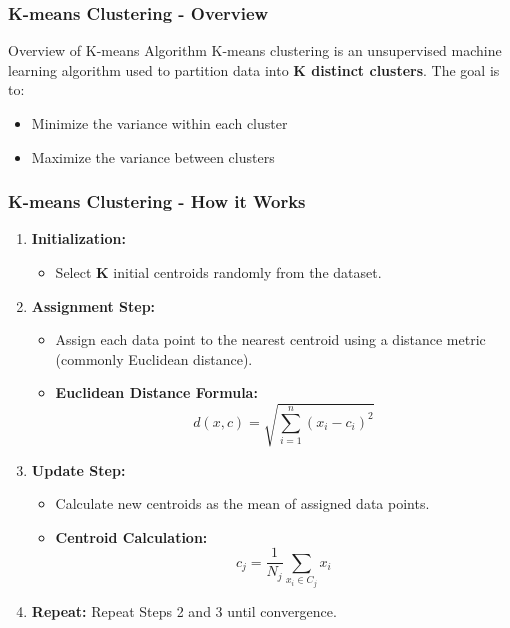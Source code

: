 \documentclass[aspectratio=169]{beamer}
\begin{document}
\begin{frame}[fragile]
    \frametitle{K-means Clustering - Overview}
    \begin{block}{Overview of K-means Algorithm}
        K-means clustering is an unsupervised machine learning algorithm used to partition data into \textbf{K distinct clusters}. The goal is to:
        \begin{itemize}
            \item Minimize the variance within each cluster
            \item Maximize the variance between clusters
        \end{itemize}
    \end{block}
\end{frame}

\begin{frame}[fragile]
    \frametitle{K-means Clustering - How it Works}
    \begin{enumerate}
        \item \textbf{Initialization:}
        \begin{itemize}
            \item Select \textbf{K} initial centroids randomly from the dataset.
        \end{itemize}
        \item \textbf{Assignment Step:}
        \begin{itemize}
            \item Assign each data point to the nearest centroid using a distance metric (commonly Euclidean distance).
            \item \textbf{Euclidean Distance Formula:} 
            \begin{equation}
                d(x, c) = \sqrt{\sum_{i=1}^{n} (x_i - c_i)^2}
            \end{equation}
        \end{itemize}
        \item \textbf{Update Step:}
        \begin{itemize}
            \item Calculate new centroids as the mean of assigned data points.
            \item \textbf{Centroid Calculation:}
            \begin{equation}
                c_j = \frac{1}{N_j} \sum_{x_i \in C_j} x_i
            \end{equation}
        \end{itemize}
        \item \textbf{Repeat:} Repeat Steps 2 and 3 until convergence.
    \end{enumerate}
\end{frame}
\end{document}
